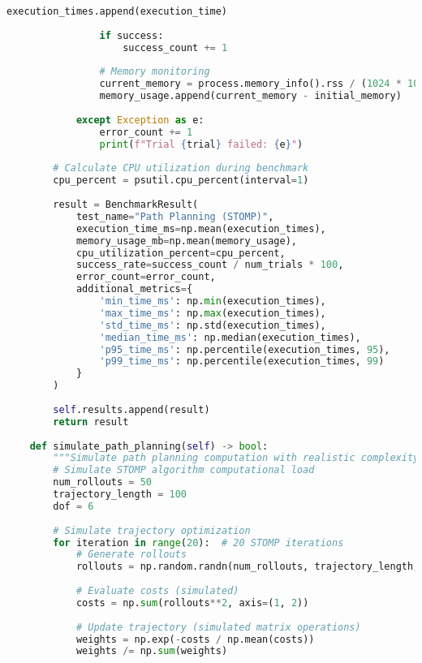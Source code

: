 \begin{lstlisting}[language=Python, caption={Performance Benchmark Script}, label={lst:app-benchmark-script}]
                execution_times.append(execution_time)
                
                if success:
                    success_count += 1
                
                # Memory monitoring
                current_memory = process.memory_info().rss / (1024 * 1024)
                memory_usage.append(current_memory - initial_memory)
                
            except Exception as e:
                error_count += 1
                print(f"Trial {trial} failed: {e}")
        
        # Calculate CPU utilization during benchmark
        cpu_percent = psutil.cpu_percent(interval=1)
        
        result = BenchmarkResult(
            test_name="Path Planning (STOMP)",
            execution_time_ms=np.mean(execution_times),
            memory_usage_mb=np.mean(memory_usage),
            cpu_utilization_percent=cpu_percent,
            success_rate=success_count / num_trials * 100,
            error_count=error_count,
            additional_metrics={
                'min_time_ms': np.min(execution_times),
                'max_time_ms': np.max(execution_times),
                'std_time_ms': np.std(execution_times),
                'median_time_ms': np.median(execution_times),
                'p95_time_ms': np.percentile(execution_times, 95),
                'p99_time_ms': np.percentile(execution_times, 99)
            }
        )
        
        self.results.append(result)
        return result
    
    def simulate_path_planning(self) -> bool:
        """Simulate path planning computation with realistic complexity"""
        # Simulate STOMP algorithm computational load
        num_rollouts = 50
        trajectory_length = 100
        dof = 6
        
        # Simulate trajectory optimization
        for iteration in range(20):  # 20 STOMP iterations
            # Generate rollouts
            rollouts = np.random.randn(num_rollouts, trajectory_length, dof)
            
            # Evaluate costs (simulated)
            costs = np.sum(rollouts**2, axis=(1, 2))
            
            # Update trajectory (simulated matrix operations)
            weights = np.exp(-costs / np.mean(costs))
            weights /= np.sum(weights)
            

\end{lstlisting}
